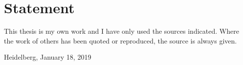 \section*{Statement}
\setlength{\parindent}{0em}

\vspace{3\baselineskip}
This thesis is my own work and I have only used the sources indicated. Where the work of others has been quoted or reproduced, the source is always given.\par
\vspace{5\baselineskip}
Heidelberg, January 18, 2019\hspace{3cm}\dotfill

